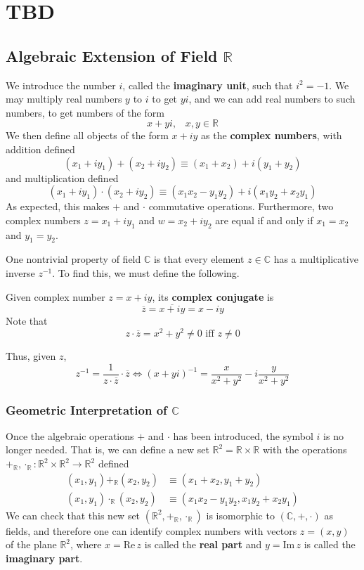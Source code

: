 \section{TBD}

  \subsection[Algebraic Extension of Field R]{Algebraic Extension of Field $\mathbb{R}$}

  We introduce the number $i$, called the \textbf{imaginary unit}, such that $i^2 = -1$. We may multiply real numbers $y$ to $i$ to get $yi$, and we can add real numbers to such numbers, to get numbers of the form 
  \[x + yi, \;\;\; x, y \in \mathbb{R}\]
  We then define all objects of the form $x + iy$ as the \textbf{complex numbers}, with addition defined
  \[(x_1 + i y_1) + (x_2 + i y_2) \equiv (x_1 + x_2) + i (y_1 + y_2)\]
  and multiplication defined
  \[(x_1 + i y_1) \cdot (x_2 + i y_2) \equiv (x_1 x_2 - y_1 y_2) + i (x_1 y_2 + x_2 y_1)\]
  As expected, this makes $+$ and $\cdot$ commutative operations. Furthermore, two complex numbers $z = x_1 + i y_1$ and $w = x_2 + i y_2$ are equal if and only if $x_1 = x_2$ and $y_1 = y_2$. 

  One nontrivial property of field $\mathbb{C}$ is that every element $z \in \mathbb{C}$ has a multiplicative inverse $z^{-1}$. To find this, we must define the following. 

  \begin{definition}
    Given complex number $z = x + i y$, its \textbf{complex conjugate} is 
    \[\overline{z} = \overline{x + iy} = x - iy\]
    Note that 
    \[z \cdot \overline{z} = x^2 + y^2 \neq 0 \text{ iff } z \neq 0\]
  \end{definition}

  Thus, given $z$, 
  \[z^{-1} = \frac{1}{z \cdot \overline{z}} \cdot \overline{z} \iff (x + yi)^{-1} = \frac{x}{x^2 + y^2} - i \frac{y}{x^2 + y^2}\]

  \subsubsection[Geometric Interpretation of C]{Geometric Interpretation of $\mathbb{C}$}
  Once the algebraic operations $+$ and $\cdot$ has been introduced, the symbol $i$ is no longer needed. That is, we can define a new set $\mathbb{R}^2 = \mathbb{R} \times \mathbb{R}$ with the operations $+_\mathbb{R}, \cdot_\mathbb{R} : \mathbb{R}^2 \times \mathbb{R}^2 \longrightarrow \mathbb{R}^2$ defined
  \begin{align*}
      (x_1, y_1) +_\mathbb{R} (x_2, y_2) & \equiv (x_1 + x_2, y_1 + y_2) \\
      (x_1, y_1) \cdot_\mathbb{R} (x_2, y_2) & \equiv (x_1 x_2 - y_1 y_2, x_1 y_2 + x_2 y_1)
  \end{align*}
  We can check that this new set $(\mathbb{R}^2, +_\mathbb{R}, \cdot_{\mathbb{R}})$ is isomorphic to $(\mathbb{C}, +, \cdot)$ as fields, and therefore one can identify complex numbers with vectors $z = (x, y)$ of the plane $\mathbb{R}^2$, where $x = \text{Re}\,z$ is called the \textbf{real part} and $y = \text{Im}\,z$ is called the \textbf{imaginary part}. 

